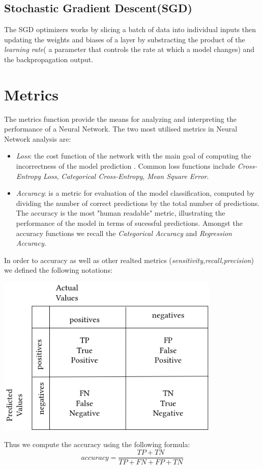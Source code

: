\subsection*{Stochastic Gradient Descent(SGD)}
The SGD optimizers works by slicing a batch of data into individual inputs then updating the
weights and biases of a layer by substracting the product of the \textit{learning rate}( a parameter that controls the rate
at which a model changes) and the backpropagation output.

\section{Metrics}
The metrics function provide the means for analyzing and interpreting the performance of a Neural Network.
The two most utilised metrics in Neural Network analysis are:
\begin{itemize}
	\item \textit{Loss}:
		the cost function of the network with the main goal of computing
		the incorrectness of the model prediction . Common loss functions include \textit{Cross-Entropy Loss},
		\textit{Categorical Cross-Entropy}, \textit{Mean Square Error}.
	\item \textit{Accuracy}: is a metric for evaluation of the model classification,
		computed by dividing the number of correct predictions by the total
		number of predictions.
		The accuracy is the most "human readable" metric, illustrating the
		performance of the model in terms of sucessful predictions. Amongst the accuracy
		functions we recall the \textit{Categorical Accuracy} and \textit{Regression Accuracy}.
\end{itemize}

In order to accuracy as well as other realted metrics (\textit{sensitivity,recall,precision}) we defined the following
notations:
\begin{center}
	\includegraphics[width = 4.2in]{images/cm.png}
	\centerline{}
\label{cm}
\end{center}
Thus we compute the accuracy using the following formula:
\[accuracy = \frac{TP+TN}{TP+FN+FP+TN} \]
